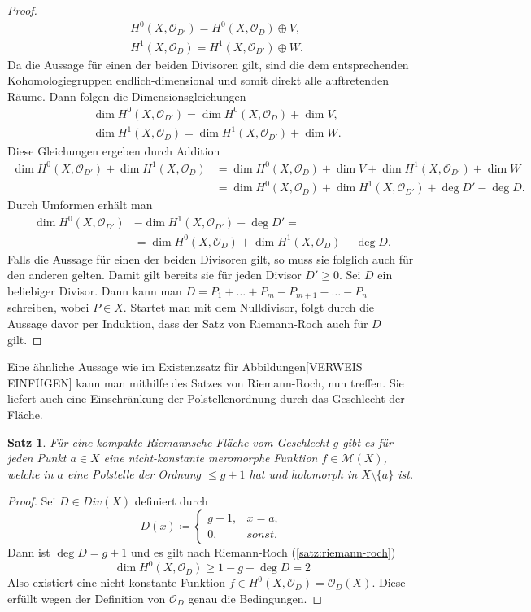 \documentclass[11pt,a4paper,toc=bibliography]{scrartcl}
\theoremstyle{thm}
\newtheorem{satz}{Satz}[section]
\theoremstyle{def}
\theoremstyle{remark}
\begin{document}
\begin{proof}
\begin{align*}
	&H^0(X,\mathcal{O}_{D'})=H^0(X,\mathcal{O}_D)\oplus V,\\
	&H^1(X,\mathcal{O}_D)=H^1(X,\mathcal{O}_{D'})\oplus W.
\end{align*}
Da die Aussage für einen der beiden Divisoren gilt, sind die dem entsprechenden Kohomologiegruppen endlich-dimensional und somit direkt alle auftretenden Räume. Dann folgen die Dimensionsgleichungen
\begin{align*}
&\dim H^0(X,\mathcal{O}_{D'})=\dim H^0(X,\mathcal{O}_D)+\dim V,\\
&\dim H^1(X,\mathcal{O}_D)=\dim H^1(X,\mathcal{O}_{D'})+\dim W.
\end{align*}
Diese Gleichungen ergeben durch Addition
\begin{align*}
	\dim H^0(X,\mathcal{O}_{D'})+\dim H^1(X,\mathcal{O}_D) &=\dim H^0(X,\mathcal{O}_D)+\dim V+\dim H^1(X,\mathcal{O}_{D'})+\dim W\\
	&=\dim H^0(X,\mathcal{O}_D)+\dim H^1(X,\mathcal{O}_{D'})+\deg D'-\deg D.
\end{align*}
Durch Umformen erhält man
\begin{align*}
\dim H^0(X,\mathcal{O}_{D'})&-\dim H^1(X,\mathcal{O}_{D'})-\deg D'=\\
							&=\dim H^0(X,\mathcal{O}_D)+\dim H^1(X,\mathcal{O}_D)-\deg D.	
\end{align*}
Falls die Aussage für einen der beiden Divisoren gilt, so muss sie folglich auch für den anderen gelten. Damit gilt bereits sie für jeden Divisor $D'\geq 0$. Sei $D$ ein beliebiger Divisor. Dann kann man $D=P_1+\ldots+P_m-P_{m+1}-\ldots-P_n$ schreiben, wobei $P\in X.$ Startet man mit dem Nulldivisor, folgt durch die Aussage davor per Induktion, dass der Satz von Riemann-Roch auch für $D$ gilt.
\end{proof}
Eine ähnliche Aussage wie im Existenzsatz für Abbildungen[VERWEIS EINFÜGEN] kann man mithilfe des Satzes von Riemann-Roch, nun treffen. Sie liefert auch eine Einschränkung der Polstellenordnung durch das Geschlecht der Fläche.
\begin{satz}
	Für eine kompakte Riemannsche Fläche vom Geschlecht $g$ gibt es für jeden Punkt $a\in X$ eine nicht-konstante meromorphe Funktion $f\in \mathcal{M}(X)$, welche in $a$ eine Polstelle der Ordnung $\leq g+1$ hat und holomorph in $X\setminus\{a\}$ ist.
\end{satz} 
\begin{proof}
	Sei $D\in Div(X)$ definiert durch
	\[
		D(x)\coloneqq
	\begin{cases}
		g+1, &x=a,\\
		0, &sonst.
	\end{cases}
	\]
	Dann ist $\deg D = g+1$ und es gilt nach Riemann-Roch (\ref{satz:riemann-roch})
	\[
	\dim H^0(X,\mathcal{O}_D)\geq 1-g+\deg D=2 
	\]
	Also existiert eine nicht konstante Funktion $f\in H^0(X,\mathcal{O}_D)=\mathcal{O}_D(X)$. Diese erfüllt wegen der Definition von $\mathcal{O}_D$ genau die Bedingungen.
\end{proof}
\end{document}
